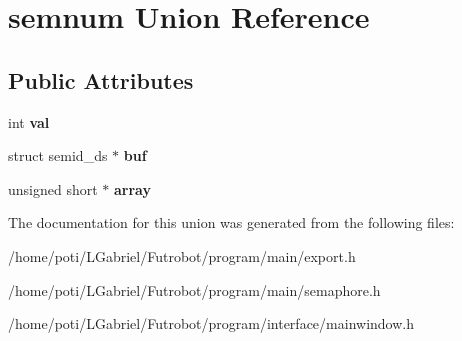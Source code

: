 \hypertarget{unionsemnum}{}\section{semnum Union Reference}
\label{unionsemnum}
\subsection*{Public Attributes}
\begin{DoxyCompactItemize}
\item 
int {\bfseries val}\hypertarget{unionsemnum_a1c8df8d84c0310a6f893a66d4e96d5c3}{}\label{unionsemnum_a1c8df8d84c0310a6f893a66d4e96d5c3}

\item 
struct semid\+\_\+ds $\ast$ {\bfseries buf}\hypertarget{unionsemnum_a1c0e29284f0c574af98c9d80f1838e15}{}\label{unionsemnum_a1c0e29284f0c574af98c9d80f1838e15}

\item 
unsigned short $\ast$ {\bfseries array}\hypertarget{unionsemnum_a0a962817e121d42fcc05c9d163b90b42}{}\label{unionsemnum_a0a962817e121d42fcc05c9d163b90b42}

\end{DoxyCompactItemize}


The documentation for this union was generated from the following files\+:\begin{DoxyCompactItemize}
\item 
/home/poti/\+L\+Gabriel/\+Futrobot/program/main/export.\+h\item 
/home/poti/\+L\+Gabriel/\+Futrobot/program/main/semaphore.\+h\item 
/home/poti/\+L\+Gabriel/\+Futrobot/program/interface/mainwindow.\+h\end{DoxyCompactItemize}
